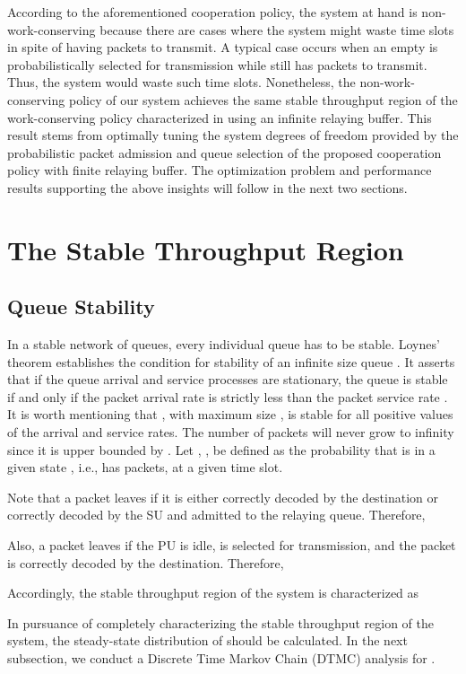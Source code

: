 \documentclass[conference]{IEEEtran}
\begin{document}
According to the aforementioned cooperation policy, the system 
at hand is non-work-conserving because there are cases
where the system might waste time slots in spite of having packets
to transmit. A typical case occurs when an empty  is
probabilistically selected for transmission while  still
has packets to transmit. Thus, the system would waste such time
slots. Nonetheless, the non-work-conserving policy of our system
achieves the same stable throughput region of the work-conserving
policy characterized in \cite{R_CoopAcc} using an infinite relaying buffer. 
This result stems from optimally tuning the system degrees of freedom provided 
by the probabilistic packet admission and queue selection of 
the proposed cooperation policy with finite relaying buffer. 
The optimization problem and performance results supporting the 
above insights will follow in the next two sections.

\section{The Stable Throughput Region}
\subsection{Queue Stability}
In a stable network of queues, every individual queue has to be stable.
Loynes' theorem establishes the condition for stability of an
infinite size queue \cite{L_QStab}. It asserts that if the queue arrival and
service processes are stationary, the queue is stable if and only
if the packet arrival rate  is strictly less than the
packet service rate . It is worth mentioning that
, with maximum size , is stable for all positive values of the arrival and
service rates. The number of packets will never grow to infinity
since it is upper bounded by . Let , , be
defined as the probability that  is in a given state ,
i.e.,  has  packets, at a given time slot.


Note that a packet leaves  if it is either correctly decoded
by the destination or correctly decoded by the SU and 
admitted to the relaying queue. Therefore,

Also, a packet leaves  if the PU is idle,  is selected
for transmission, and the packet is correctly decoded by the
destination. Therefore,

Accordingly, the stable throughput region of the system is characterized
as

In pursuance of completely characterizing the stable throughput
region of the system, the steady-state distribution of 
should be calculated. In the next subsection, we conduct a
Discrete Time Markov Chain (DTMC) analysis for .
\end{document}
